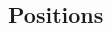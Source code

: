 \documentclass[10pt]{article} %
\begin{document}
\begin{paracol}{2}




\section{Positions}



\end{paracol}
\end{document}
